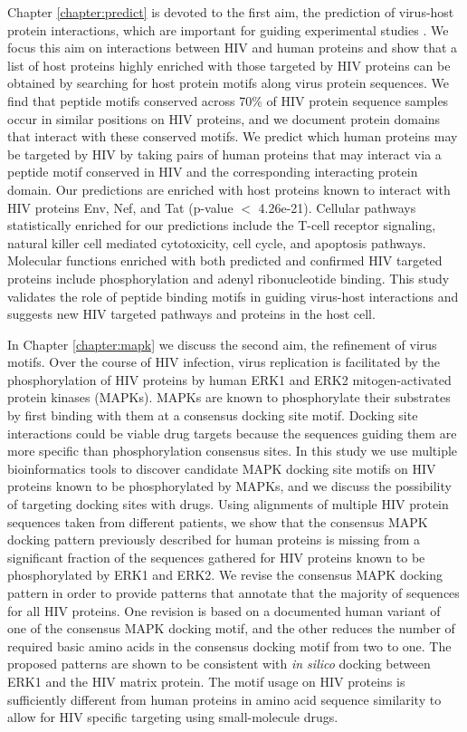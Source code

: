 Chapter \ref{chapter:predict} is devoted to the first aim, the
prediction of virus-host protein interactions, which are important for
guiding experimental studies
\cite{jansen2003bayesian,lee2004probabilistic}. We focus this aim on
interactions between HIV and human proteins and show that a list of
host proteins highly enriched with those targeted by HIV proteins can
be obtained by searching for host protein motifs along virus protein
sequences. We find that peptide motifs conserved across 70\% of HIV
protein sequence samples occur in similar positions on HIV proteins,
and we document protein domains that interact with these conserved
motifs. We predict which human proteins may be targeted by HIV by
taking pairs of human proteins that may interact via a peptide motif
conserved in HIV and the corresponding interacting protein domain. Our
predictions are enriched with host proteins known to interact with HIV
proteins Env, Nef, and Tat (p-value $<$ 4.26e-21). Cellular pathways
statistically enriched for our predictions include the T-cell receptor
signaling, natural killer cell mediated cytotoxicity, cell cycle, and
apoptosis pathways. Molecular functions enriched with both predicted
and confirmed HIV targeted proteins include phosphorylation and adenyl
ribonucleotide binding. This study validates the role of peptide
binding motifs in guiding virus-host interactions and suggests new HIV
targeted pathways and proteins in the host cell.

In Chapter \ref{chapter:mapk} we discuss the second aim, the
refinement of virus motifs. Over the course of HIV infection, virus
replication is facilitated by the phosphorylation of HIV proteins by
human ERK1 and ERK2 mitogen-activated protein kinases (MAPKs). MAPKs
are known to phosphorylate their substrates by first binding with them
at a consensus docking site motif. Docking site interactions could be
viable drug targets because the sequences guiding them are more
specific than phosphorylation consensus sites. In this study we use
multiple bioinformatics tools to discover candidate MAPK docking site
motifs on HIV proteins known to be phosphorylated by MAPKs, and we
discuss the possibility of targeting docking sites with drugs. Using
alignments of multiple HIV protein sequences taken from different
patients, we show that the consensus MAPK docking pattern previously
described for human proteins is missing from a significant fraction of
the sequences gathered for HIV proteins known to be phosphorylated by
ERK1 and ERK2. We revise the consensus MAPK docking pattern in order
to provide patterns that annotate that the majority of sequences for
all HIV proteins. One revision is based on a documented human variant
of one of the consensus MAPK docking motif, and the other reduces the
number of required basic amino acids in the consensus docking motif
from two to one. The proposed patterns are shown to be consistent with
\textit{in silico} docking between ERK1 and the HIV matrix protein. The motif
usage on HIV proteins is sufficiently different from human proteins in
amino acid sequence similarity to allow for HIV specific targeting
using small-molecule drugs. 

